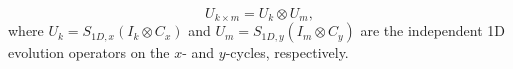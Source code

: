 \begin{equation}
U_{k \times m} = U_k \otimes U_m,
\label{eq:factorised_unitary}
\end{equation}
where \(U_k = S_{1D,x} (I_k \otimes C_x)\) and
\(U_m = S_{1D,y} (I_m \otimes C_y)\) are the independent 1D evolution
operators on the \(x\)- and \(y\)-cycles, respectively.
